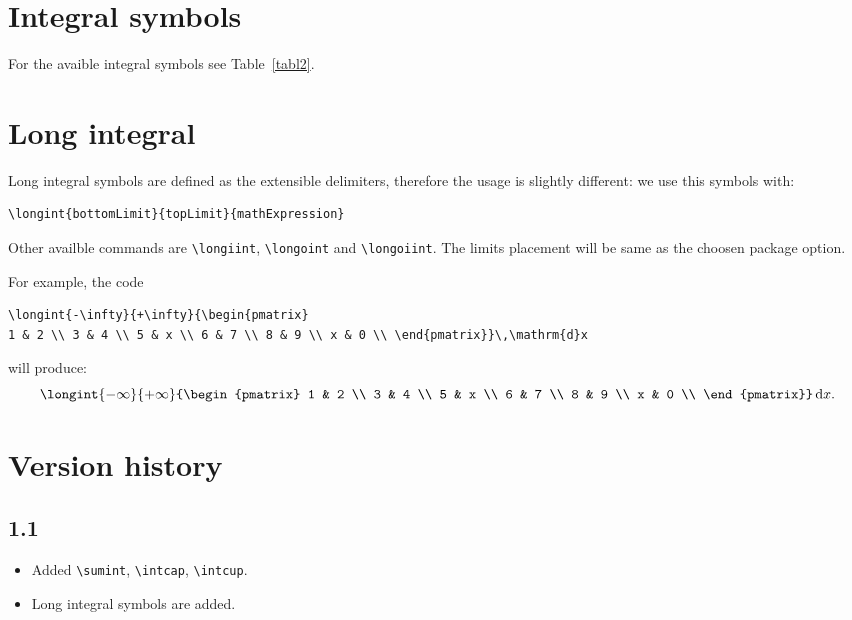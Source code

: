 \documentclass{article}
\begin{document}
\section{Integral symbols}

For the avaible integral symbols see Table~\ref{tabl2}.

\section{Long integral}

Long integral symbols are defined as the extensible delimiters, therefore the usage is slightly different: we use this symbols with:
\begin{verbatim}
\longint{bottomLimit}{topLimit}{mathExpression}
\end{verbatim}
Other availble commands are \verb|\longiint|, \verb|\longoint| and \verb|\longoiint|. The limits placement will be same as the choosen package option.

For example, the code
\begin{verbatim}
\longint{-\infty}{+\infty}{\begin{pmatrix}
1 & 2 \\ 3 & 4 \\ 5 & x \\ 6 & 7 \\ 8 & 9 \\ x & 0 \\ \end{pmatrix}}\,\mathrm{d}x
\end{verbatim}
will produce:
\[\longint{-\infty}{+\infty}{\begin{pmatrix}
	1 & 2 \\ 3 & 4 \\ 5 & x \\ 6 & 7 \\ 8 & 9 \\ x & 0 \\ \end{pmatrix}}\,\mathrm{d}x.\]

\section{Version history}

\subsection*{1.1}

\begin{itemize}
	\item Added \verb|\sumint|, \verb|\intcap|, \verb|\intcup|.
	\item Long integral symbols are added.
\end{itemize}
\end{document}
